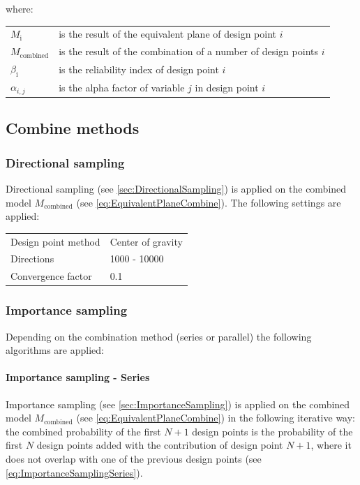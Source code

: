 {where:

\begin{longtable*}{p{20mm}p{\textwidth-24pt-20mm}}  
	$M_{\text{i}}$ & is the result of the equivalent plane of design point $i$ \\
	$M_{\text{combined}}$ & is the result of the combination of a number of design points $i$ \\
	$\beta_{\text{i}}$ & is the reliability index of design point $i$ \\
	$\alpha_{i,j}$ & is the alpha factor of variable $j$ in design point $i$
\end{longtable*}

\subsection{Combine methods}

\subsubsection{Directional sampling}
\label{sec:CombiningDesignPointsDS}

Directional sampling (see \autoref{sec:DirectionalSampling}) is applied on the combined model $M_{\text{combined}}$
(see \autoref{eq:EquivalentPlaneCombine}). The following settings are applied: 

\begin{longtable*}{p{40mm}p{\textwidth-40mm}}  
	Design point method & Center of gravity \\
	Directions & 1000 - 10000 \\
	Convergence factor & 0.1
\end{longtable*}

\subsubsection{Importance sampling}
\label{sec:CombiningDesignPointsIS}

Depending on the combination method (series or parallel) the following algorithms are applied:

\paragraph*{Importance sampling - Series}

Importance sampling (see \autoref{sec:ImportanceSampling}) is applied on the combined model $M_{\text{combined}}$
(see \autoref{eq:EquivalentPlaneCombine}) in the following iterative way: the combined probability of the first $N+1$ design points is the probability of the first $N$ design points added with the contribution of design point $N+1$, where it does not overlap with one of the previous design points (see \autoref{eq:ImportanceSamplingSeries}).

}
